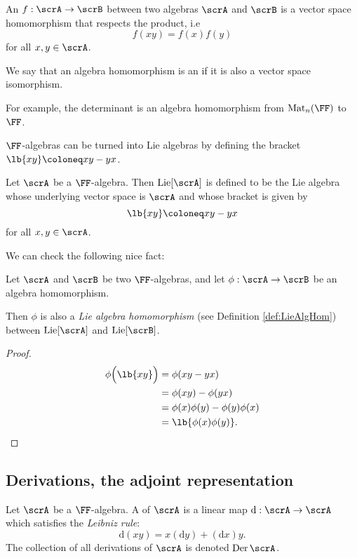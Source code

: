 \documentclass{article}
\DeclarePairedDelimiter\lb\lbrack\rbrack
\DeclareMathOperator{\Mat}{Mat}
\DeclareMathOperator{\Lie}{Lie}
\DeclareMathOperator{\Der}{Der}
\newcommand{\dd}{\ensuremath{\text{d}}}
\begin{document}
\begin{definition}
    An  $f: \scrA \to \scrB$ between two algebras $\scrA$ and $\scrB$ is a vector space homomorphism that respects the product, i.e
    \[
        f(xy) 
        = 
        f(x)f(y)
    \]
    for all $x, y \in \scrA$.

    We say that an algebra homomorphism is an  if it is also a vector space isomorphism.
\end{definition}

For example, the determinant is an algebra homomorphism from $\Mat_n(\FF)$ to $\FF$.

$\FF$-algebras can be turned into Lie algebras by defining the bracket $\lb{xy} \coloneq xy - yx$.

\begin{definition}
    Let $\scrA$ be a $\FF$-algebra.
    Then $\Lie[\scrA]$ is defined to be the Lie algebra whose underlying vector space is $\scrA$ and whose bracket is given by
    \[
        \lb{xy}
        \coloneq
        xy - yx
    \]
    for all $x, y \in \scrA$.
\end{definition}

We can check the following nice fact: 

\begin{proposition}
    Let $\scrA$ and $\scrB$ be two $\FF$-algebras, and let $\phi: \scrA \to \scrB$ be an algebra homomorphism.

    Then $\phi$ is also a \textit{Lie algebra homomorphism} (see Definition \ref{def:LieAlgHom}) between $\Lie[\scrA]$ and $\Lie[\scrB]$.
\end{proposition}
\begin{proof}
    \begin{align*}
        \phi\Big(\lb{xy}\Big)
        &=
        \phi(xy - yx)
        \\
        &=
        \phi(xy) - \phi(yx)
        \\
        &=
        \phi(x)\phi(y) - \phi(y)\phi(x)
        \\
        &=
        \lb{\phi(x)\phi(y)}.
    \end{align*}
\end{proof}

\subsection{Derivations, the adjoint representation}

\begin{definition}
    Let $\scrA$ be a $\FF$-algebra.
    A  of $\scrA$ is a linear map $\dd: \scrA \to \scrA$ which satisfies the \textit{Leibniz rule}:
    \[
        \dd(xy)
        =
        x(\dd y) + (\dd x) y.
    \]
    The collection of all derivations of $\scrA$ is denoted $\Der \scrA$.
\end{definition}
\end{document}
